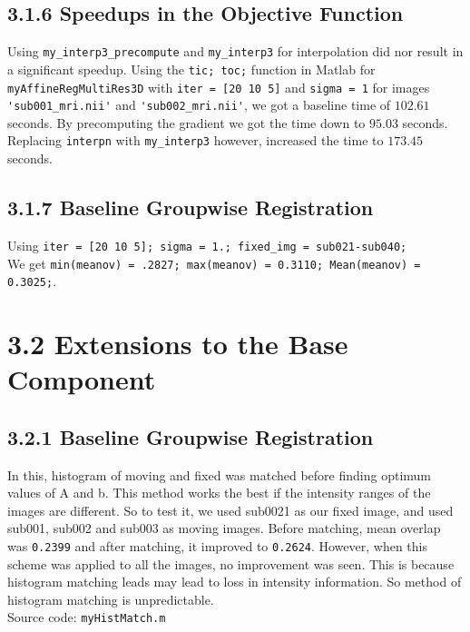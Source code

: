 \documentclass{article}
\begin{document}
\begin{par}
		

		\subsection*{3.1.6 Speedups in the Objective Function}
		Using \lstinline|my_interp3_precompute| and \lstinline|my_interp3| for interpolation did nor result in a significant speedup. Using the \lstinline|tic; toc;| function in Matlab for \lstinline|myAffineRegMultiRes3D| with \lstinline|iter = [20 10 5]| and \lstinline|sigma = 1| for images \lstinline|'sub001_mri.nii'| and \lstinline|'sub002_mri.nii'|, we got a baseline time of $102.61$ seconds. By precomputing the gradient we got the time down to $95.03$ seconds. Replacing \lstinline|interpn| with \lstinline|my_interp3| however, increased the time to $173.45$ seconds.


		\subsection*{3.1.7 Baseline Groupwise Registration}
		Using \lstinline|iter = [20 10 5]; sigma = 1.; fixed_img = sub021-sub040;| \\
		We get \lstinline|min(meanov) = .2827; max(meanov) = 0.3110; Mean(meanov) = 0.3025;|. 
	


		\section*{3.2 Extensions to the Base Component}		
		
		\subsection*{3.2.1 Baseline Groupwise Registration}
		In this, histogram of moving and fixed was matched before finding optimum values of A and b. This method works the best if the intensity ranges of the images are different. So to test it, we used sub0021 as our fixed image, and used sub001, sub002 and sub003 as moving images. Before matching, mean overlap was \lstinline|0.2399| and after matching, it improved to \lstinline|0.2624|. However, when this scheme was applied to all the images, no improvement was seen. This is because histogram matching leads may lead to loss in intensity information. So method of histogram matching is unpredictable.\\
		Source code: \lstinline|myHistMatch.m|
		

\end{par}
\end{document}
